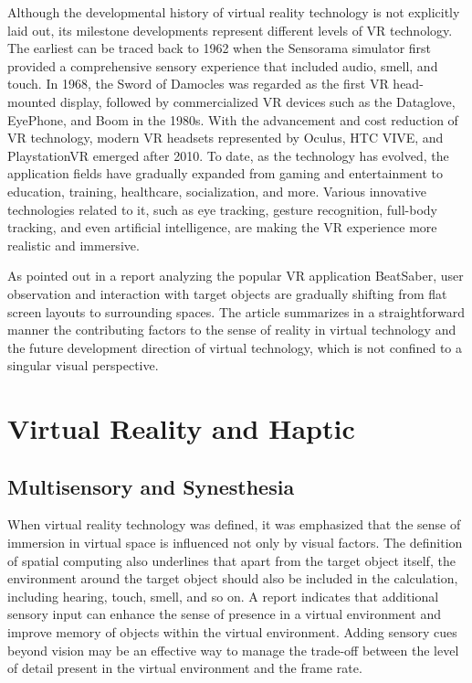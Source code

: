 Although the developmental history of virtual reality technology is not explicitly laid out, its milestone developments represent different levels of VR technology. The earliest can be traced back to 1962 when the Sensorama simulator first provided a comprehensive sensory experience that included audio, smell, and touch. In 1968, the Sword of Damocles was regarded as the first VR head-mounted display, followed by commercialized VR devices such as the Dataglove, EyePhone, and Boom in the 1980s. With the advancement and cost reduction of VR technology, modern VR headsets represented by Oculus, HTC VIVE, and PlaystationVR emerged after 2010. To date, as the technology has evolved, the application fields have gradually expanded from gaming and entertainment to education, training, healthcare, socialization, and more. Various innovative technologies related to it, such as eye tracking, gesture recognition, full-body tracking, and even artificial intelligence, are making the VR experience more realistic and immersive.

As pointed out in a report analyzing the popular VR application BeatSaber, user observation and interaction with target objects are gradually shifting from flat screen layouts to surrounding spaces. The article summarizes in a straightforward manner the contributing factors to the sense of reality in virtual technology and the future development direction of virtual technology, which is not confined to a singular visual perspective.

\section{Virtual Reality and Haptic}
\subsection{Multisensory and Synesthesia}

When virtual reality technology was defined, it was emphasized that the sense of immersion in virtual space is influenced not only by visual factors. The definition of spatial computing also underlines that apart from the target object itself, the environment around the target object should also be included in the calculation, including hearing, touch, smell, and so on. A report\cite{paper16} indicates that additional sensory input can enhance the sense of presence in a virtual environment and improve memory of objects within the virtual environment. Adding sensory cues beyond vision may be an effective way to manage the trade-off between the level of detail present in the virtual environment and the frame rate.

